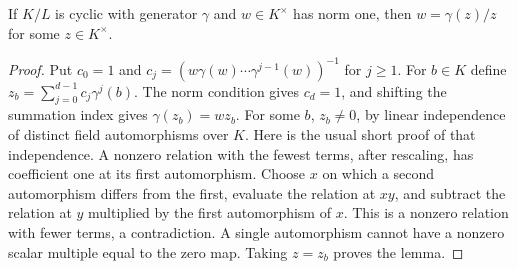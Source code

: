 \begin{lemma}\label{su-hilbert90}
If $K/L$ is cyclic with generator $\gamma$ and
$w\in K^\times$ has norm one, then $w=\gamma(z)/z$
for some $z\in K^\times$.
\end{lemma}
\begin{proof}
Put $c_0=1$ and
$c_j=(w\gamma(w)\cdots\gamma^{j-1}(w))^{-1}$ for $j\ge1$.
For $b\in K$ define $z_b=\sum_{j=0}^{d-1}c_j\gamma^j(b)$.
The norm condition gives $c_d=1$, and shifting the summation
index gives $\gamma(z_b)=wz_b$.
For some $b$, $z_b\ne0$, by linear independence of distinct
field automorphisms over $K$.
Here is the usual short proof of that independence.
A nonzero relation with the fewest terms, after rescaling,
has coefficient one at its first automorphism.
Choose $x$ on which a second automorphism differs from the
first, evaluate the relation at $xy$, and subtract the
relation at $y$ multiplied by the first automorphism of $x$.
This is a nonzero relation with fewer terms, a contradiction.
A single automorphism cannot have a nonzero scalar multiple
equal to the zero map.  Taking $z=z_b$ proves the lemma.
\end{proof}

